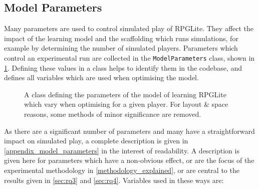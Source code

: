 \subsection{Model Parameters}
\label{model_parameters}

Many parameters are used to control simulated play of RPGLite. They affect the
impact of the learning model and the scaffolding which runs simulations, for
example by determining the number of simulated players. Parameters which control
an experimental run are collected in the \lstinline{ModelParameters} class,
shown in \cref{fig:model_parameters_class}. Defining these values in a class
helps to identify them in the codebase, and defines all variables which are used
when optimising the model.

\begin{figure}[tp]
    \centering
    
    \caption{A class defining the parameters of the model of learning RPGLite which vary when optimising for a given player. For layout \& space reasons, some methods of minor significance are removed.}
    \label{fig:model_parameters_class}
\end{figure}

As there are a significant number of parameters and many have a straightforward
impact on simulated play, a complete description is given in
\cref{appendix_model_parameters} in the interest of readability. A description
is given here for parameters which have a non-obvious effect, or are the focus
of the experimental methodology in \cref{methodology_explained}, or are central
to the results given in \cref{sec:rq3} and \cref{sec:rq4}. Variables used in
these ways are:

